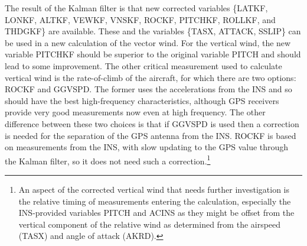 \documentclass[12pt,twoside,english,12pt,twoside,english]{article}\usepackage[]{graphicx}\usepackage[]{color}
\let\OrgIndex\index
\renewcommand*{\index}[1]{\OrgIndex{#1}}
\begin{document}
The
result of the Kalman filter is that new corrected variables
\{LATKF, LONKF,
ALTKF, VEWKF,
VNSKF,
ROCKF, PITCHKF,
ROLLKF, and THDGKF\}
are available. These and the variables
\{TASX, ATTACK,
SSLIP\}
can be used in a new calculation of the vector wind.
For the vertical wind, the new variable PITCHKF should be superior
to the original variable PITCH
and should lead to some improvement. The other critical measurement
used to calculate vertical wind is the rate-of-climb of the aircraft,
for which there are two options: ROCKF
and GGVSPD.
The former uses the accelerations
 from the INS and so should have
the best high-frequency
characteristics, although GPS receivers
provide very good measurements now even at high frequency. The other
difference between these two choices is that if GGVSPD
is used then a correction is needed for the separation
of the GPS antenna
from the INS\@. ROCKF is based on measurements from the INS, with
slow updating to the GPS value through the Kalman filter, so it does
not need such a correction.\footnote{An aspect of the corrected vertical wind that needs further investigation
is the relative timing of measurements entering the calculation, especially
the INS-provided variables PITCH
and ACINS as they might be offset
from the vertical component of the relative
wind as determined from the airspeed (TASX)
and angle of attack (AKRD).}
\end{document}
